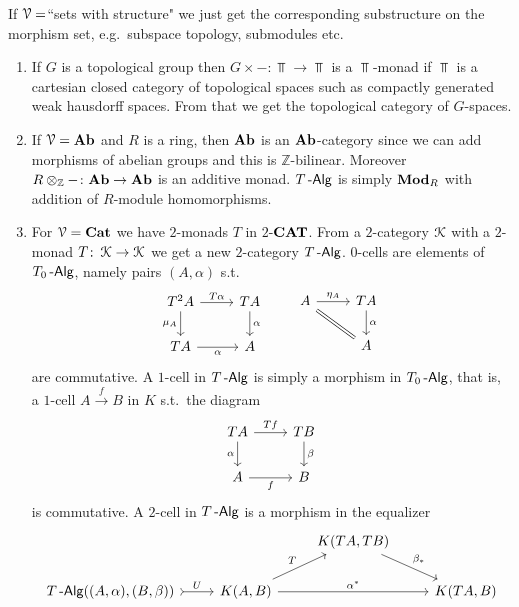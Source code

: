 \documentclass[a4paper,11pt,oneside,openany]{scrbook}
\begin{document}
\begin{exmp}
	If $\operatorname{\mathcal{V}}=$``sets with structure" we just get the corresponding substructure on the morphism set, e.g.\ subspace topology, submodules etc.
	\begin{enumerate}
		\item If $G$ is a topological group then $G\times-\colon\Top\to\Top$ is a $\Top$-monad if $\Top$ is a cartesian closed category of topological spaces such as compactly generated weak hausdorff spaces. From that we get the topological category of $G$-spaces.
		\item If $\operatorname{\mathcal{V}}={\normalfont\textbf{Ab}}$ and $R$ is a ring, then ${\normalfont\textbf{Ab}}$ is an ${\normalfont\textbf{Ab}}$-category since we can add morphisms of abelian groups and this is $\mathbb{Z}$-bilinear. Moreover $R\otimes_\mathbb{Z}-\colon{\normalfont\textbf{Ab}}\to{\normalfont\textbf{Ab}}$ is an additive monad. $T\operatorname{-\mathsf{Alg}}$ is simply ${\normalfont\textbf{Mod}}_R$ with addition of $R$-module homomorphisms.
		\item For $\operatorname{\mathcal{V}}={\normalfont\textbf{Cat}}$ we have $2$-monads $T$ in $2$-${\normalfont\textbf{CAT}}$. From a $2$-category $\operatorname{\mathcal{K}}$ with a $2$-monad $T\colon \operatorname{\mathcal{K}}\to \operatorname{\mathcal{K}}$ we get a new $2$-category $T\operatorname{-\mathsf{Alg}}$.
		      $0$-cells are elements of $T_0\operatorname{-\mathsf{Alg}}$, namely pairs $(A,\alpha)$ s.t.
		      \[
			      \begin{tikzcd}
				      T^2 A\ar["\mu_{A}"']{d}\ar["T\alpha"]{r}
				      & TA\ar["\alpha"]{d} \\
				      TA\ar["\alpha"']{r}
				      & A
			      \end{tikzcd}
			      \quad\quad
			      \begin{tikzcd}
				      A\ar[equal, swap]{dr}\ar["\eta_{A}"]{r}
				      & TA\ar["\alpha"]{d} \\
				      & A
			      \end{tikzcd}
		      \]
		      are commutative.
		      A $1$-cell in $T\operatorname{-\mathsf{Alg}}$ is simply a morphism in $T_0\operatorname{-\mathsf{Alg}}$, that is, a $1$-cell $A\xrightarrow{f}B$ in $K$ s.t.\ the diagram
		      \[
			      \begin{tikzcd}
				      TA\arrow[d, "\alpha"']\arrow["Tf"]{r}
				      & TB\arrow[d, "\beta"]\\
				      A\arrow["f"']{r}
				      & B
			      \end{tikzcd}
		      \]
		      is commutative. A $2$-cell in $T\operatorname{-\mathsf{Alg}}$ is a morphism in the equalizer
		      \[
			      \begin{tikzcd}
				      && K(TA,TB) \arrow[rd, "\beta_*"] &  \\
				      T\Alg((A,\alpha),(B,\beta)) \arrow[r, tail, "U"] & K(A,B) \arrow[rr, "\alpha^*"] \arrow[ru, "T"] &             & K(TA,B)
			      \end{tikzcd}
\]
\end{enumerate}
\end{exmp}
\end{document}
